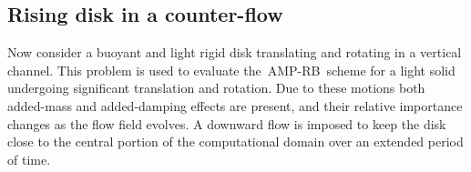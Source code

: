 {}
\newcommand{\ampRB}{AMP-RB}%
\newcommand{\old}[1]{{\color{red}old: #1}}
\newcommand{\jwb}[1]{{\color{jwbGreen}#1}}
\newcommand{\Gcrd}{\Gc_{\rm{rd}}}%
\newlength{\ycbTop}%
\newlength{\ycbMid}%
\newcommand{\channelWidth}{{x_c}}
\newcommand{\profileWidth}{{x_p}}
\newcommand{\channelBottom}{{y_0}}
\newcommand{\channelTop}{{y_1}}
\newcommand{\diskRadius}{{R_b}}
\newcommand{\rampFunction}{{\cal R}}
\newcommand{\f}[2]{\frac{#1}{#2}}%
\newcommand{\fvbe}{\fv_e}%
\newcommand{\gvbe}{\gv_e}%


\subsection{Rising disk in a counter-flow} \label{sec:diskDrop}

\medskip

Now consider a buoyant and light rigid disk translating and rotating in a vertical channel.
This problem is used to evaluate the~\ampRB~scheme for a light solid
undergoing significant translation and 
rotation. Due to these motions both added-mass and added-damping
effects are present, and their relative importance changes as the flow field evolves.
 A downward flow is imposed
to keep the disk close to the central portion of the computational domain over an extended period of time.








